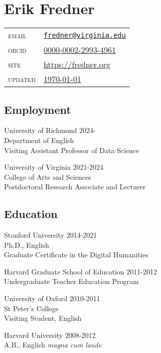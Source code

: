 \documentclass[
  12pt,
  letterpaper,
]{article}
\author{}
\date{}
\begin{document}
\hypertarget{erik-fredner}{%
\section{Erik Fredner}\label{erik-fredner}}

\begin{longtable}[]{@{}ll@{}}
\endhead
\endlastfoot
\textsc{email} &
\href{mailto:fredner@virginia.edu}{\nolinkurl{fredner@virginia.edu}} \\
\textsc{orcid} &
\href{https://orcid.org/0000-0002-2993-4961}{0000-0002-2993-4961} \\
\textsc{site} & \href{https://fredner.org}{https://fredner.org}\\
\textsc{updated} & \href{https://github.com/erikfredner/cv}{\today} \\
\end{longtable}

\hypertarget{employment}{%
\subsection{Employment}\label{employment}}

University of Richmond \hfill 2024-\\
Department of English\\
Visiting Assistant Professor of Data Science

University of Virginia \hfill 2021-2024\\
College of Arts and Sciences\\
Postdoctoral Research Associate and Lecturer

\hypertarget{education}{%
\subsection{Education}\label{education}}

Stanford University \hfill 2014-2021\\
Ph.D., English\\
Graduate Certificate in the Digital Humanities

Harvard Graduate School of Education \hfill 2011-2012\\
Undergraduate Teacher Education Program

University of Oxford \hfill 2010-2011\\
St Peter's College\\
Visiting Student, English

Harvard University \hfill 2008-2012\\
A.B., English \emph{magna cum laude}
\end{document}
